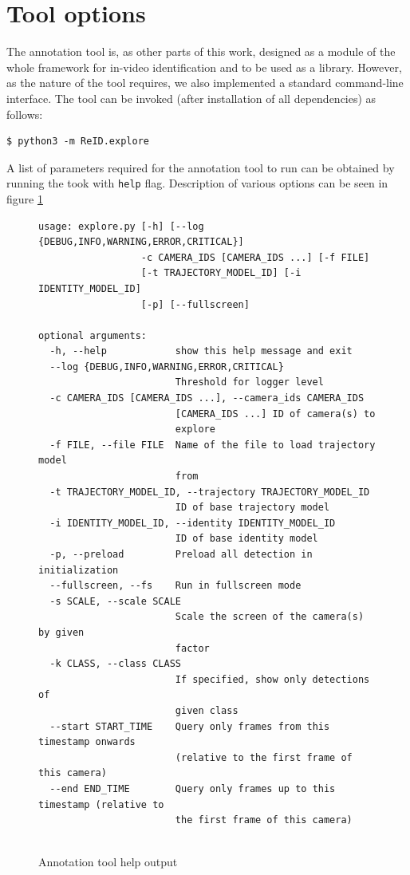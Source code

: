 \section{Tool options}

The annotation tool is, as other parts of this work, designed as a module of the whole
framework for in-video identification and to be used as a library. However, as the
nature of the tool requires, we also implemented a standard command-line interface.
The tool can be invoked (after installation of all dependencies) as follows:

\begin{verbatim}
$ python3 -m ReID.explore    
\end{verbatim}

A list of parameters required for the annotation tool to run can be obtained by running
the took with \texttt{\-\-help} flag. Description of various options can be seen in
figure \ref{fig:annotation_tool_help}

\begin{figure}
    \begin{verbatim}
usage: explore.py [-h] [--log {DEBUG,INFO,WARNING,ERROR,CRITICAL}]
                  -c CAMERA_IDS [CAMERA_IDS ...] [-f FILE]
                  [-t TRAJECTORY_MODEL_ID] [-i IDENTITY_MODEL_ID]
                  [-p] [--fullscreen]

optional arguments:
  -h, --help            show this help message and exit
  --log {DEBUG,INFO,WARNING,ERROR,CRITICAL}
                        Threshold for logger level
  -c CAMERA_IDS [CAMERA_IDS ...], --camera_ids CAMERA_IDS
                        [CAMERA_IDS ...] ID of camera(s) to
                        explore
  -f FILE, --file FILE  Name of the file to load trajectory model
                        from
  -t TRAJECTORY_MODEL_ID, --trajectory TRAJECTORY_MODEL_ID
                        ID of base trajectory model
  -i IDENTITY_MODEL_ID, --identity IDENTITY_MODEL_ID
                        ID of base identity model
  -p, --preload         Preload all detection in initialization
  --fullscreen, --fs    Run in fullscreen mode
  -s SCALE, --scale SCALE
                        Scale the screen of the camera(s) by given
                        factor
  -k CLASS, --class CLASS
                        If specified, show only detections of
                        given class
  --start START_TIME    Query only frames from this timestamp onwards
                        (relative to the first frame of this camera)
  --end END_TIME        Query only frames up to this timestamp (relative to
                        the first frame of this camera)


    \end{verbatim}
    \caption{Annotation tool help output}
    \label{fig:annotation_tool_help}
\end{figure}

